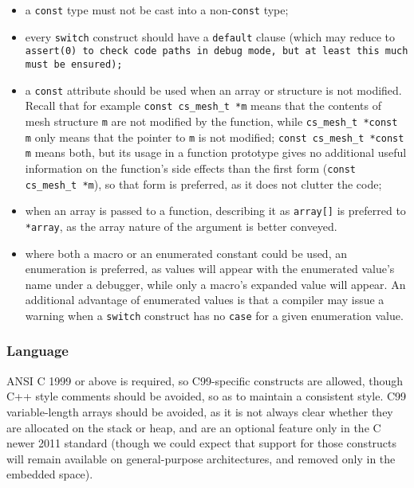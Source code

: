 \begin{itemize}
\item a \texttt{const} type must not be cast into a non-\texttt{const}
  type;

\item every \texttt{switch} construct should have a \texttt{default}
  clause (which may reduce to \texttt{assert(0) to check code paths in
  debug mode, but at least this much must be ensured);}

\item a \texttt{const} attribute should be used when an array or structure
  is not  modified. Recall that for example \texttt{const cs\_mesh\_t *m}
  means that the contents of mesh structure \texttt{m} are not modified
  by the function, while \texttt{cs\_mesh\_t *const m} only means that
  the pointer to \texttt{m} is not modified;
  \texttt{const cs\_mesh\_t *const m} means both, but its usage in
  a function prototype gives no additional useful information on
  the function's side effects than the first form
  (\texttt{const cs\_mesh\_t *m}), so that form is preferred, as it
  does not clutter the code;

\item when an array is passed to a function, describing it as
  \texttt{array[]} is preferred to \texttt{*array}, as the array
  nature of the argument is better conveyed.

\item where both a macro or an enumerated constant could be used,
  an enumeration is preferred, as values will appear with the
  enumerated value's name under a debugger, while only a macro's
  expanded value will appear. An additional advantage of enumerated
  values is that a compiler may issue a warning when a \texttt{switch}
  construct has no \texttt{case} for a given enumeration value.
\end{itemize}

\subsubsection{Language\label{sec:regle.lang}}

ANSI C 1999 or above is required, so C99-specific constructs are allowed,
though C++ style comments should be avoided, so as to maintain a consistent
style. C99 variable-length arrays should be avoided, as it is not
always clear whether they are allocated on the stack or heap, and are
an optional feature only in the C newer 2011 standard (though we could
expect that support for those constructs will remain available on
general-purpose architectures, and removed only in the embedded space).

